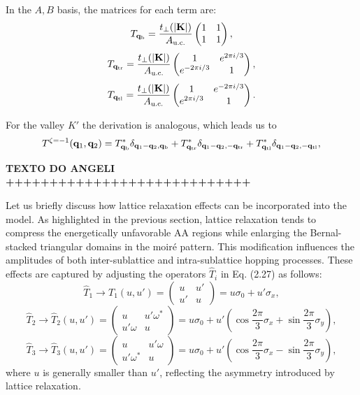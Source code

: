 In the \( A, B \) basis, the matrices for each term are:
\begin{equation} \label{eq:T-qb}
T_{{\vb{q}}_\text{b}} = \frac{t_\perp(\abs{{\vb{K}}})}{A_{\text{u.c.}}}
\begin{pmatrix}
1 & 1 \\
1 & 1
\end{pmatrix},
\end{equation}
\begin{equation} \label{eq:T-qtr}
T_{{\vb{q}}_\text{tr}} = \frac{t_\perp(\abs{{\vb{K}}})}{A_{\text{u.c.}}}
\begin{pmatrix}
1 & e^{2\pi i/3} \\
e^{-2\pi i/3} & 1
\end{pmatrix},
\end{equation}
\begin{equation} \label{eq:T-qtl}
T_{{\vb{q}}_\text{tl}} = \frac{t_\perp(\abs{{\vb{K}}})}{A_{\text{u.c.}}}
\begin{pmatrix}
1 & e^{-2\pi i/3} \\
e^{2\pi i/3} & 1
\end{pmatrix}.
\end{equation}

For the valley $K'$ the derivation is analogous, which leads us to
\begin{equation} \label{eq:interlayer-3terms_valley-1}
T^{\zeta=-1}({\vb{q}}_1, {\vb{q}}_2) = T_{{\vb{q}}_\text{b}}^* \delta_{{\vb{q}}_1 - {\vb{q}}_2, {\vb{q}}_\text{b}}
+ T_{{\vb{q}}_\text{tr}}^* \delta_{{\vb{q}}_1 - {\vb{q}}_2, -{\vb{q}}_\text{tr}}
+ T_{{\vb{q}}_\text{tl}}^* \delta_{{\vb{q}}_1 - {\vb{q}}_2, -{\vb{q}}_\text{tl}},
\end{equation}

\textbf{TEXTO DO ANGELI ++++++++++++++++++++++++++++}

Let us briefly discuss how lattice relaxation effects can be incorporated into the model. As highlighted in the previous section, lattice relaxation tends to compress the energetically unfavorable AA regions while enlarging the Bernal-stacked triangular domains in the moiré pattern. This modification influences the amplitudes of both inter-sublattice and intra-sublattice hopping processes. These effects are captured by adjusting the operators \( \hat{T}_i \) in Eq. (2.27) as follows:
\[
\hat{T}_1 \to T_1(u, u') =
\begin{pmatrix}
u & u' \\
u' & u
\end{pmatrix}
= u \sigma_0 + u' \sigma_x,
\]
\[
\hat{T}_2 \to \hat{T}_2(u, u') =
\begin{pmatrix}
u & u' \omega^* \\
u' \omega & u
\end{pmatrix}
= u \sigma_0 + u'
\left(
\cos \frac{2\pi}{3} \sigma_x + \sin \frac{2\pi}{3} \sigma_y
\right),
\]
\[
\hat{T}_3 \to \hat{T}_3(u, u') =
\begin{pmatrix}
u & u' \omega \\
u' \omega^* & u
\end{pmatrix}
= u \sigma_0 + u'
\left(
\cos \frac{2\pi}{3} \sigma_x - \sin \frac{2\pi}{3} \sigma_y
\right),
\]
where \( u \) is generally smaller than \( u' \), reflecting the asymmetry introduced by lattice relaxation.

